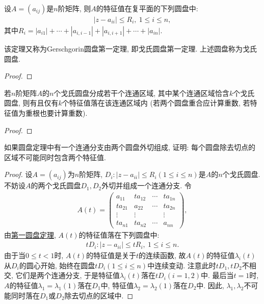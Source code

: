 \documentclass[../../main.tex]{subfiles}
\begin{document}
\begin{theorem}[第一圆盘定理]\label{theorem:第一圆盘定理}
设\(A = (a_{ij})\)是\(n\)阶矩阵, 则\(A\)的特征值在复平面的下列圆盘中:
\begin{align*}
|z - a_{ii}| \leqslant  R_{i},\ 1 \leqslant  i \leqslant  n,
\end{align*}
其中\(R_{i} = |a_{i1}| + \cdots + |a_{i,i - 1}| + |a_{i,i + 1}| + \cdots + |a_{in}|\).
\end{theorem}
\begin{remark}
该定理又称为Gerschgorin圆盘第一定理, 即戈氏圆盘第一定理. 上述圆盘称为戈氏圆盘.
\end{remark}
\begin{proof}


\end{proof}

\begin{theorem}[第二圆盘定理]\label{theorem:第二圆盘定理}
若\(n\)阶矩阵\(A\)的\(n\)个戈氏圆盘分成若干个连通区域, 其中某个连通区域恰含\(k\)个戈氏圆盘, 则有且仅有\(k\)个特征值落在该连通区域内 (若两个圆盘重合应计算重数, 若特征值为重根也要计算重数).
\end{theorem}
\begin{proof}


\end{proof}

\begin{example}
如果圆盘定理中有一个连通分支由两个圆盘外切组成, 证明: 每个圆盘除去切点的区域不可能同时包含两个特征值.
\end{example}
\begin{proof}
设\(A = (a_{ij})\)为\(n\)阶矩阵, \(D_{i}:|z - a_{ii}| \leqslant  R_{i}(1 \leqslant  i \leqslant  n)\)是\(A\)的\(n\)个戈氏圆盘. 不妨设\(A\)的两个戈氏圆盘\(D_{1},D_{2}\)外切并组成一个连通分支. 令
\begin{align*}
A(t)= 
\begin{pmatrix}
a_{11} & ta_{12} & \cdots & ta_{1n}\\
ta_{21} & a_{22} & \cdots & ta_{2n}\\
\vdots & \vdots & & \vdots\\
ta_{n1} & ta_{n2} & \cdots & a_{nn}
\end{pmatrix},
\end{align*}
由\hyperref[theorem:第一圆盘定理]{第一圆盘定理}, \(A(t)\)的特征值落在下列圆盘中:
\begin{align*}
tD_{i}:|z - a_{ii}| \leqslant  tR_{i},\ 1 \leqslant  i \leqslant  n.
\end{align*}
由于当\(0 \leqslant  t < 1\)时, \(A(t)\)的特征值是关于\(t\)的连续函数, 故\(A(t)\)的特征值\(\lambda_{i}(t)\)从\(D_{i}\)的圆心开始, 始终在圆盘\(tD_{i}(1 \leqslant  i \leqslant  n)\)中连续变动. 注意此时\(tD_{1},tD_{2}\)不相交, 它们是两个连通分支, 于是特征值\(\lambda_{i}(t)\)落在\(tD_{i}(i = 1,2)\)中. 最后当\(t = 1\)时, \(A\)的特征值\(\lambda_{1}=\lambda_{1}(1)\)落在\(D_{1}\)中, 特征值\(\lambda_{2}=\lambda_{2}(1)\)落在\(D_{2}\)中. 因此, \(\lambda_{1},\lambda_{2}\)不可能同时落在\(D_{1}\)或\(D_{2}\)除去切点的区域中.

\end{proof}
\end{document}
